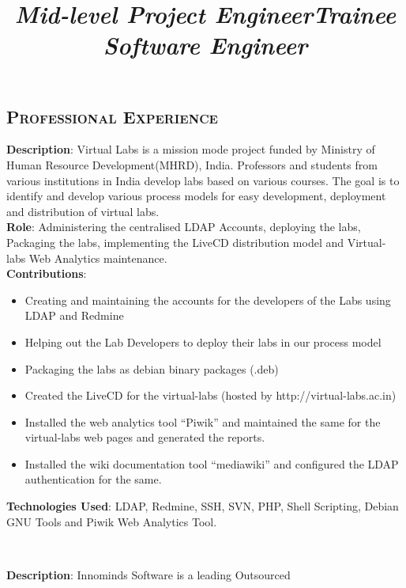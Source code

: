 \begin{resume}
\section{\textsc{Professional Experience}}
\title{\em \textbf{Mid-level Project Engineer}}
\begin{position}
\textbf{Description}: Virtual Labs is a mission mode project funded by
Ministry of Human Resource Development(MHRD), India. Professors and
students from various institutions in India develop labs based on
various courses. The goal is to identify and develop various process
models for easy development, deployment and distribution of virtual
labs.\\
\textbf{Role}: Administering the centralised LDAP Accounts, deploying
the labs, Packaging the labs, implementing the LiveCD distribution
model and Virtual-labs Web Analytics maintenance.\\
\textbf{Contributions}:
\begin{itemize}
\item Creating and maintaining the accounts for the developers of the
  Labs using LDAP and Redmine
\item Helping out the Lab Developers to deploy their labs in our
  process model
\item Packaging the labs as debian binary packages (.deb)
\item Created the LiveCD for the virtual-labs (hosted by
  http://virtual-labs.ac.in)
\item Installed the web analytics tool ``Piwik'' and maintained the same
  for the virtual-labs web pages and generated the reports.
\item Installed the wiki documentation tool ``mediawiki'' and
  configured the LDAP authentication for the same.\end{itemize}
\textbf{Technologies Used}: LDAP, Redmine, SSH, SVN, PHP, Shell
Scripting, Debian GNU Tools and Piwik Web Analytics Tool.
\end{position}
\\
\title{\em \textbf{Trainee Software Engineer}}
\begin{position}
\textbf{Description}: Innominds Software is a leading Outsourced

\end{position}
\end{resume}
